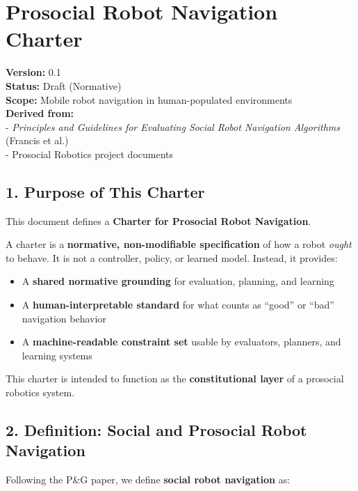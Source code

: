 \documentclass[utf8]{frontiers_suppmat} %
\providecommand{\tightlist}{%
  \setlength{\itemsep}{0pt}\setlength{\parskip}{0pt}}
\begin{document}
\section{Prosocial Robot Navigation
Charter}\label{prosocial-robot-navigation-charter}

\textbf{Version:} 0.1\\
\textbf{Status:} Draft (Normative)\\
\textbf{Scope:} Mobile robot navigation in human-populated
environments\\
\textbf{Derived from:}\\
- \emph{Principles and Guidelines for Evaluating Social Robot Navigation
Algorithms} (Francis et al.)\\
- Prosocial Robotics project documents

\subsection{1. Purpose of This Charter}\label{purpose-of-this-charter}

This document defines a \textbf{Charter for Prosocial Robot Navigation}.

A charter is a \textbf{normative, non-modifiable specification} of how a
robot \emph{ought} to behave. It is not a controller, policy, or learned
model. Instead, it provides:

\begin{itemize}
\tightlist
\item
  A \textbf{shared normative grounding} for evaluation, planning, and
  learning
\item
  A \textbf{human-interpretable standard} for what counts as ``good'' or
  ``bad'' navigation behavior
\item
  A \textbf{machine-readable constraint set} usable by evaluators,
  planners, and learning systems
\end{itemize}

This charter is intended to function as the \textbf{constitutional
layer} of a prosocial robotics system.

\subsection{2. Definition: Social and Prosocial Robot
Navigation}\label{definition-social-and-prosocial-robot-navigation}

Following the P\&G paper, we define \textbf{social robot navigation} as:
\end{document}
